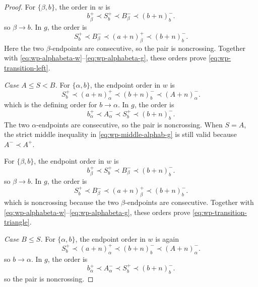 \documentclass[11pt]{article}
\theoremstyle{definition}
\begin{document}
\begin{proof}
For \(\{\beta,b\}\), the order in \(w\) is
\begin{equation}
   b_\beta^+
   \prec
   S_b^+
   \prec
   B_\beta^-
   \prec
   (b+n)_b^-.
   \label{eq:wp-left-betab-w}
\end{equation}
so \(\beta\to b\). In \(g\), the order is
\begin{equation}
   S_b^+
   \prec
   B_\beta^-
   \prec
   (a+n)_\beta^+
   \prec
   (b+n)_b^-.
   \label{eq:wp-left-betab-g}
\end{equation}
Here the two \(\beta\)-endpoints are consecutive, so the pair is noncrossing.
Together with \eqref{eq:wp-alphabeta-w}--\eqref{eq:wp-alphabeta-g}, these
orders prove \eqref{eq:wp-transition-left}.

\smallskip
\noindent\emph{Case \(A\le S<B\).}
For \(\{\alpha,b\}\), the endpoint order in \(w\) is
\begin{equation}
   S_b^+
   \prec
   (a+n)_\alpha^+
   \prec
   (b+n)_b^-
   \prec
   (A+n)_\alpha^-.
   \label{eq:wp-middle-alphab-w}
\end{equation}
which is the defining order for \(b\to\alpha\). In \(g\), the order is
\begin{equation}
   b_\alpha^+
   \prec
   A_\alpha^-
   \prec
   S_b^+
   \prec
   (b+n)_b^-.
   \label{eq:wp-middle-alphab-g}
\end{equation}
The two \(\alpha\)-endpoints are consecutive, so the pair is noncrossing.
When \(S=A\), the strict middle inequality in
\eqref{eq:wp-middle-alphab-g} is still valid because
\(A^-\prec A^+\).

For \(\{\beta,b\}\), the endpoint order in \(w\) is
\begin{equation}
   b_\beta^+
   \prec
   S_b^+
   \prec
   B_\beta^-
   \prec
   (b+n)_b^-.
   \label{eq:wp-middle-betab-w}
\end{equation}
so \(\beta\to b\). In \(g\), the order is
\begin{equation}
   S_b^+
   \prec
   B_\beta^-
   \prec
   (a+n)_\beta^+
   \prec
   (b+n)_b^-.
   \label{eq:wp-middle-betab-g}
\end{equation}
which is noncrossing because the two \(\beta\)-endpoints are consecutive.
Together with \eqref{eq:wp-alphabeta-w}--\eqref{eq:wp-alphabeta-g}, these
orders prove \eqref{eq:wp-transition-triangle}.

\smallskip
\noindent\emph{Case \(B\le S\).}
For \(\{\alpha,b\}\), the endpoint order in \(w\) is again
\begin{equation}
   S_b^+
   \prec
   (a+n)_\alpha^+
   \prec
   (b+n)_b^-
   \prec
   (A+n)_\alpha^-.
   \label{eq:wp-right-alphab-w}
\end{equation}
so \(b\to\alpha\). In \(g\), the order is
\begin{equation}
   b_\alpha^+
   \prec
   A_\alpha^-
   \prec
   S_b^+
   \prec
   (b+n)_b^-.
   \label{eq:wp-right-alphab-g}
\end{equation}
so the pair is noncrossing.


\end{proof}
\end{document}
